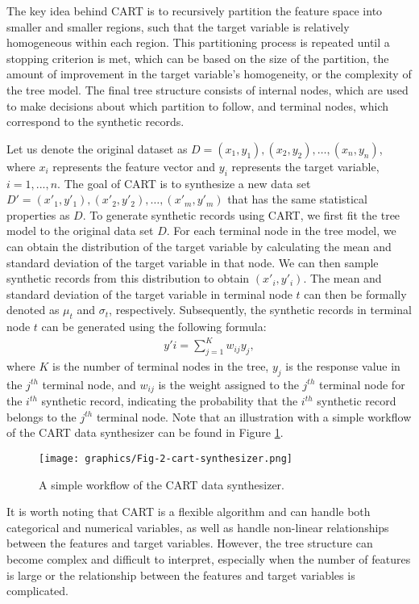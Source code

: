 The key idea behind CART is to recursively partition the feature space into smaller and smaller regions, such that the target variable is relatively homogeneous within each region. This partitioning process is repeated until a stopping criterion is met, which can be based on the size of the partition, the amount of improvement in the target variable's homogeneity, or the complexity of the tree model. The final tree structure consists of internal nodes, which are used to make decisions about which partition to follow, and terminal nodes, which correspond to the synthetic records.

Let us denote the original dataset as $D = { (x_1,y_1),(x_2,y_2),\dots,(x_n,y_n)}$, where $x_i$ represents the feature vector and $y_i$ represents the target variable, $i=1,...,n$. The goal of CART is to synthesize a new data set $D' = { (x'_1,y'_1),(x'_2,y'_2),\dots,(x'_m,y'_m)}$ that has the same statistical properties as $D$. To generate synthetic records using CART, we first fit the tree model to the original data set $D$. For each terminal node in the tree model, we can obtain the distribution of the target variable by calculating the mean and standard deviation of the target variable in that node. We can then sample synthetic records from this distribution to obtain $(x'_i,y'_i)$. The mean and standard deviation of the target variable in terminal node $t$ can then be formally denoted as $\mu_t$ and $\sigma_t$, respectively. Subsequently, the synthetic records in terminal node $t$ can be generated using the following formula:
\begin{align}
    \label{equ:cart}
    y'i = \sum_{j=1}^{K} w_{ij} y_{j},
\end{align}
where $K$ is the number of terminal nodes in the tree, $y_j$ is the response value in the $j^{th}$ terminal node, and $w_{ij}$ is the weight assigned to the $j^{th}$ terminal node for the $i^{th}$ synthetic record, indicating the probability that the $i^{th}$ synthetic record belongs to the $j^{th}$ terminal node. Note that an illustration with a simple workflow of the CART data synthesizer can be found in Figure \ref{fig:cartsyn}.
\begin{figure}[H]
    \centering
    \texttt{[image: graphics/Fig-2-cart-synthesizer.png]}    
    \caption{A simple workflow of the CART data synthesizer.}
    \label{fig:cartsyn}
\end{figure}

It is worth noting that CART is a flexible algorithm and can handle both categorical and numerical variables, as well as handle non-linear relationships between the features and target variables. However, the tree structure can become complex and difficult to interpret, especially when the number of features is large or the relationship between the features and target variables is complicated.

